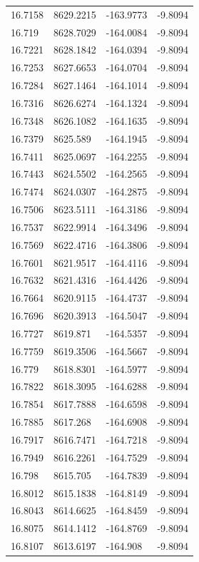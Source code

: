 \begin{table}[H]
\begin{tabular}{llll}
16.7158 & 8629.2215 & -163.9773 & -9.8094 \\
16.719 & 8628.7029 & -164.0084 & -9.8094 \\
16.7221 & 8628.1842 & -164.0394 & -9.8094 \\
16.7253 & 8627.6653 & -164.0704 & -9.8094 \\
16.7284 & 8627.1464 & -164.1014 & -9.8094 \\
16.7316 & 8626.6274 & -164.1324 & -9.8094 \\
16.7348 & 8626.1082 & -164.1635 & -9.8094 \\
16.7379 & 8625.589 & -164.1945 & -9.8094 \\
16.7411 & 8625.0697 & -164.2255 & -9.8094 \\
16.7443 & 8624.5502 & -164.2565 & -9.8094 \\
16.7474 & 8624.0307 & -164.2875 & -9.8094 \\
16.7506 & 8623.5111 & -164.3186 & -9.8094 \\
16.7537 & 8622.9914 & -164.3496 & -9.8094 \\
16.7569 & 8622.4716 & -164.3806 & -9.8094 \\
16.7601 & 8621.9517 & -164.4116 & -9.8094 \\
16.7632 & 8621.4316 & -164.4426 & -9.8094 \\
16.7664 & 8620.9115 & -164.4737 & -9.8094 \\
16.7696 & 8620.3913 & -164.5047 & -9.8094 \\
16.7727 & 8619.871 & -164.5357 & -9.8094 \\
16.7759 & 8619.3506 & -164.5667 & -9.8094 \\
16.779 & 8618.8301 & -164.5977 & -9.8094 \\
16.7822 & 8618.3095 & -164.6288 & -9.8094 \\
16.7854 & 8617.7888 & -164.6598 & -9.8094 \\
16.7885 & 8617.268 & -164.6908 & -9.8094 \\
16.7917 & 8616.7471 & -164.7218 & -9.8094 \\
16.7949 & 8616.2261 & -164.7529 & -9.8094 \\
16.798 & 8615.705 & -164.7839 & -9.8094 \\
16.8012 & 8615.1838 & -164.8149 & -9.8094 \\
16.8043 & 8614.6625 & -164.8459 & -9.8094 \\
16.8075 & 8614.1412 & -164.8769 & -9.8094 \\
16.8107 & 8613.6197 & -164.908 & -9.8094 \\

\end{tabular}
\end{table}
